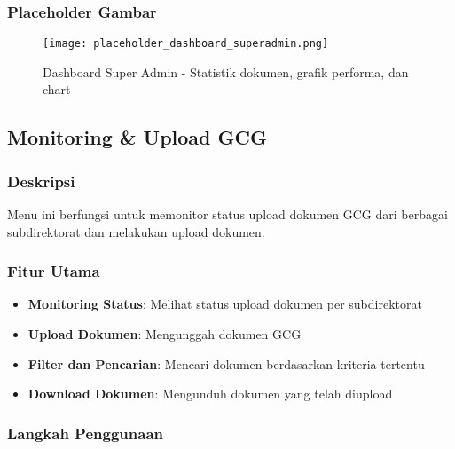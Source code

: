 \documentclass[12pt,a4paper]{article}
\begin{document}
\subsubsection{Placeholder Gambar}
\begin{figure}[H]
    \centering
    \texttt{[image: placeholder\_dashboard\_superadmin.png]}
    \caption{Dashboard Super Admin - Statistik dokumen, grafik performa, dan chart}
    \label{fig:dashboard_superadmin}
\end{figure}

\newpage

\subsection{Monitoring \& Upload GCG}

\subsubsection{Deskripsi}
Menu ini berfungsi untuk memonitor status upload dokumen GCG dari berbagai subdirektorat dan melakukan upload dokumen.

\subsubsection{Fitur Utama}
\begin{itemize}
    \item \textbf{Monitoring Status}: Melihat status upload dokumen per subdirektorat
    \item \textbf{Upload Dokumen}: Mengunggah dokumen GCG
    \item \textbf{Filter dan Pencarian}: Mencari dokumen berdasarkan kriteria tertentu
    \item \textbf{Download Dokumen}: Mengunduh dokumen yang telah diupload
\end{itemize}

\subsubsection{Langkah Penggunaan}
\end{document}
